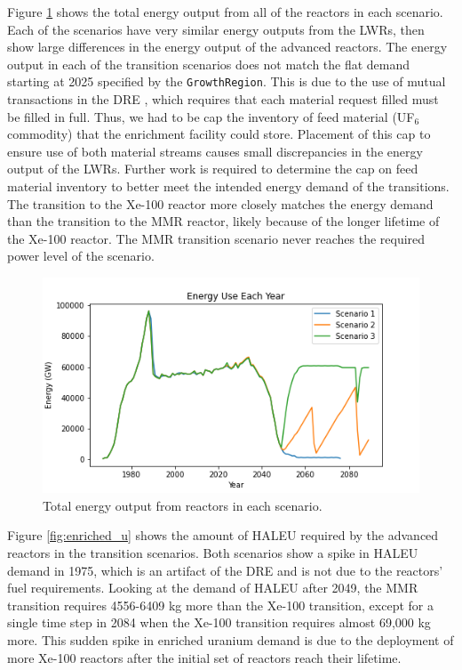 Figure \ref{fig:energy} shows the total energy output from 
all of the reactors in each scenario. Each of the scenarios
have very similar energy outputs from the \gls{LWR}s, then 
show large differences in the energy output of the advanced 
reactors. The energy output in 
each of the transition scenarios does not match the flat demand 
starting at 2025 specified by the \Cycamore \texttt{GrowthRegion}. 
This is due to 
the use of mutual transactions in the \gls{DRE} 
\cite{gidden_methodology_2016}, which requires that each 
material request filled must be filled in full. Thus, we had to be 
cap the inventory of feed material (UF$_6$ commodity) that 
the enrichment facility could store. Placement of this cap to ensure 
use of both material streams causes small discrepancies in the 
energy output of the \gls{LWR}s. Further work is required 
to determine the cap on feed material inventory to better meet 
the intended energy demand of the transitions. The transition to 
the Xe-100 reactor more closely matches the energy demand than the 
transition to the \gls{MMR} reactor, likely because of the 
longer lifetime of the Xe-100 reactor. The \gls{MMR} transition 
scenario never reaches the required power level of 
the scenario. 

\begin{figure}[ht]
    \centering
    \includegraphics[scale=0.5]{figures/energy_all.png}
    \caption{Total energy output from reactors in each scenario.}
    \label{fig:energy}
\end{figure}

Figure \ref{fig:enriched_u} shows the amount of \gls{HALEU} 
required by the advanced reactors in the transition scenarios. 
Both scenarios show a spike in \gls{HALEU} demand in 1975, which is
an artifact of the \gls{DRE} and is not due to the reactors' fuel 
requirements. Looking at the demand of \gls{HALEU} after 2049, the 
\gls{MMR} transition requires 4556-6409 kg more than the 
Xe-100 transition, except for a single time step in 2084 when 
the Xe-100 transition requires almost 69,000 kg more. This 
sudden spike in enriched uranium demand is due to the 
deployment of more Xe-100 reactors after the initial set 
of reactors reach their lifetime. 

